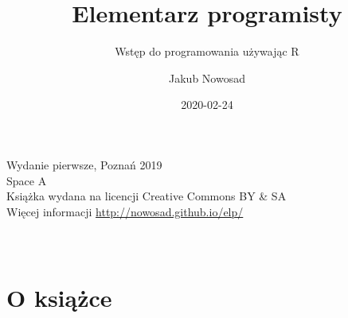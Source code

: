 \documentclass[paper=6in:9in,pagesize=pdftex,headinclude=on,footinclude=on,10pt]{scrbook}
\title{Elementarz programisty}
\subtitle{Wstęp do programowania używając R}
\author{Jakub Nowosad}
\date{2020-02-24}
\let\oldmaketitle\maketitle
\begin{document}
\maketitle

\thispagestyle{empty}


\let\maketitle\oldmaketitle
\maketitle

\thispagestyle{empty}
\vspace*{\fill}
Wydanie pierwsze, Poznań 2019 \\
Space A \\
Książka wydana na licencji Creative Commons BY \& SA \\
Więcej informacji \url{http://nowosad.github.io/elp/} \\
\\
\\

{
\setcounter{tocdepth}{1}
\tableofcontents
}
\hypertarget{o-ksiux105ux17cce}{%
\chapter*{O książce}\label{o-ksiux105ux17cce}}
\end{document}
